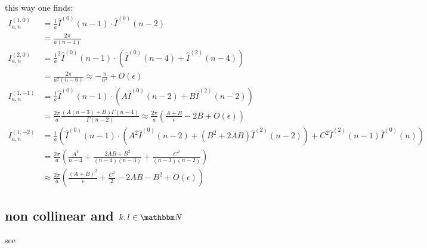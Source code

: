 \documentclass[
  english,		%
  a4paper,		%
  11pt,			%
  DIV=12,
  titlepage,
  toc=bibnumbered,
  parskip=full,  	%
  headings=normal,
  BCOR=12mm,
  numbers=noenddot
]{scrartcl}
\begin{document}
this way one finds\cite[Ch. 5]{Bojak:2000eu}\cite[App. C]{PhysRevD.40.54}:
\begin{align}
I^{(1,0)}_{a,n} &= \frac 1 a\hat I^{(0)}(n-1) \cdot \hat I^{(0)}(n-2)\\
 &= \frac {2\pi}{a(n-4)}\\
I^{(2,0)}_{a,n} &= \frac 1 a^2\hat I^{(0)}(n-1) \cdot \left(\hat I^{(0)}(n-4) + \hat I^{(2)}(n-4)\right)\\
 &= \frac {2\pi}{a^2(n-6)} \approx -\frac {\pi}{a^2} + O(\epsilon)\\
I^{(1,-1)}_{a,n} &= \frac 1 a\hat I^{(0)}(n-1)\cdot \left(A\hat I^{(0)}(n-2)+B\hat I^{(2)}(n-2)\right)\\
 &= \frac {2\pi}{a}\frac{(A(n-3)+B)\Gamma(n-4)}{\Gamma(n-2)} \approx \frac {2\pi}{a}\left(\frac{A+B}\epsilon - 2B + O(\epsilon)\right)\\
I^{(1,-2)}_{a,n} &= \frac 1 a\left(\hat I^{(0)}(n-1)\cdot \left(A^2\hat I^{(0)}(n-2)+(B^2+2AB)\hat I^{(2)}(n-2)\right) + C^2\hat I^{(2)}(n-1)\hat I^{(0)}(n)\right)\\
 &= \frac {2\pi}{a}\left(\frac {A^2}{n-4} + \frac {2AB + B^2}{(n-4)(n-3)} + \frac {C^2}{(n-3)(n-2)}\right) \\
 &\approx \frac {2\pi}{a}\left(\frac{(A+B)^2}{\epsilon}+\frac{C^2}{2}-2AB-B^2+O(\epsilon)\right)
\end{align}

\subsection{non collinear and $k,l\in\mathbbm N$}
see \cite{van_neerven_dimensional_1986}

\appendix


\listoffixmes
\end{document}
